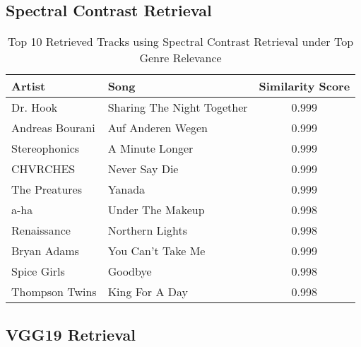 \documentclass[sigconf]{acmart}
\begin{document}
\subsection{Spectral Contrast Retrieval}


\begin{table}[H]
    \centering
    \caption{Top 10 Retrieved Tracks using Spectral Contrast Retrieval under Top Genre Relevance}
    \label{tab:retrieved_spectral_contrast_top_genre_specific}
    \footnotesize
    \begin{tabular}{l l c}
        \toprule
        \textbf{Artist} & \textbf{Song} & \textbf{Similarity Score} \\
        \midrule
        Dr. Hook & Sharing The Night Together & 0.999 \\
        Andreas Bourani & Auf Anderen Wegen & 0.999 \\
        Stereophonics & A Minute Longer & 0.999 \\
        CHVRCHES & Never Say Die & 0.999 \\
        The Preatures & Yanada & 0.999 \\
        a-ha & Under The Makeup & 0.998 \\
        Renaissance & Northern Lights & 0.998 \\
        Bryan Adams & You Can't Take Me & 0.999 \\
        Spice Girls & Goodbye & 0.998 \\
        Thompson Twins & King For A Day & 0.998 \\
        \bottomrule
    \end{tabular}
\end{table}

\subsection{VGG19 Retrieval}

\end{document}
